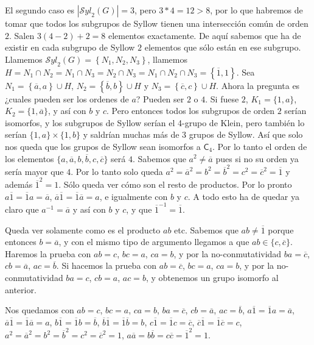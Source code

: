 \documentclass[12pt,a4paper,fleqn,spanish,final,openright]{extbook}
\theoremstyle{definition}
\theoremstyle{remark}
\begin{document}
    El segundo caso es $\left| {{\mathcal{S}yl}_{2}}(G)\right|=3$, pero $3*4=12 > 8$,
por lo que habremos de tomar que todos los subgrupos de Syllow tienen una intersección
común de orden $2$. Salen $3(4-2)+2=8$ elementos exactamente. De aquí sabemos
que ha de existir en cada subgrupo de Syllow $2$ elementos que sólo están en ese subgrupo.
Llamemos $ {{\mathcal{S}yl}_{2}}\left(G\right)=\left\{ N_1,N_2,N_3 \right\} $,
llamemos
$H = N_1    \cap N_2 = N_1    \cap N_3 = N_2    \cap N_3 =
N_1    \cap N_2    \cap N_3 = \left\{ \overline{1},1 \right\}$.
Sea $N_1=\left\{ \overline{a},a\right\}   \cup    H$, $N_2=\left\{\overline{b},b\right\}   \cup    H$ y
$N_3=\left\{ \overline{c},c\right\}   \cup    H$. Ahora la pregunta es ¿cuales pueden ser los
ordenes de $a$? Pueden ser $2$ o $4$. Si fuese $2$, $K_1 = \{1,a\}$, $K_2 = \{1,\overline{a}\}$,
y así con $b$ y $c$. Pero entonces todos los subgrupos de orden $2$ serían isomorfos,
y los subgrupos de Syllow serían el 4-grupo de Klein, pero
también lo serían $\{1,a\}   \times   \{1,b\}$ y saldrían muchas más de $3$ grupos de Syllow.
Así que solo nos queda que los
grupos de Syllow sean isomorfos a $\mathsf{C}_{4}$.
Por lo tanto el orden de los elementos $\{a,\overline{a},b,\overline{b},c,\overline{c}\}$
será $4$. Sabemos que $a^2   \neq   \overline{a}$ pues si no su orden ya
sería mayor que $4$. Por lo tanto solo queda
$a^2=\overline{a}^2=b^2=\overline{b}^2=c^2=\overline{c}^2=\overline{1}$ y
además $\overline{1}^2=1$. Sólo queda ver cómo son el resto de productos. Por lo pronto
$a\overline{1}=\overline{1}a=\overline{a}$, $\overline{a}\overline{1}=\overline{1}\overline{a}=a$,
e igualmente con $b$ y $c$. A todo esto ha de quedar ya claro que $a^{-1}=\overline{a}$
y así con $b$ y $c$, y que $\overline{1}^{-1}=\overline{1}$.

    Queda ver solamente como es el producto $ab$ etc. Sabemos que $ab   \neq   \overline{1}$
porque entonces $b=\overline{a}$, y con el mismo tipo de argumento llegamos a que
$ab    \in \{c,\overline{c}\}$. Haremos la prueba con $ab=c$, $bc=a$, $ca=b$, y por la
no-conmutatividad $ba=\overline{c}$, $cb=\overline{a}$, $ac=\overline{b}$.
Si hacemos la prueba con $ab=\overline{c}$, $bc=a$, $ca=b$, y por la no-conmutatividad
$ba=c$, $cb=a$, $ac=b$, y obtenemos un grupo isomorfo al anterior.

    Nos quedamos con $ab=c$, $bc=a$, $ca=b$, $ba=\overline{c}$, $cb=\overline{a}$,
$ac=\overline{b}$, $a\overline{1}=\overline{1}a=\overline{a}$,
$\overline{a}\overline{1}=\overline{1}\overline{a}=a$,
$b\overline{1}=\overline{1}b=\overline{b}$,
$\overline{b}\overline{1}=\overline{1}\overline{b}=b$,
$c\overline{1}=\overline{1}c=\overline{c}$,
$\overline{c}\overline{1}=\overline{1}\overline{c}=c$,
$a^2=\overline{a}^2=b^2=\overline{b}^2=c^2=\overline{c}^2=1$,
$a\overline{a}=b\overline{b}=c\overline{c}=\overline{1}^2=1$.
\end{document}
